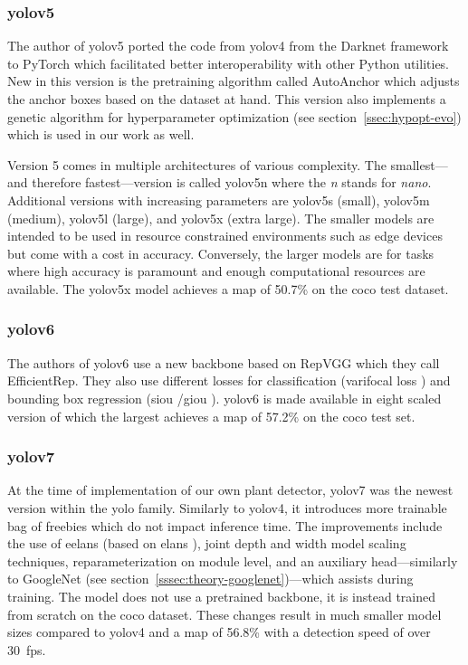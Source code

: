 \documentclass[final]{vutinfth} %
\begin{document}
\subsubsection{\gls{yolo}v5}
\label{sssec:yolov5}

The author of \gls{yolo}v5 \cite{jocher2020} ported the code from
\gls{yolo}v4 from the Darknet framework to PyTorch which facilitated
better interoperability with other Python utilities. New in this
version is the pretraining algorithm called AutoAnchor which adjusts
the anchor boxes based on the dataset at hand. This version also
implements a genetic algorithm for hyperparameter optimization (see
section~\ref{ssec:hypopt-evo}) which is used in our work as well.

Version 5 comes in multiple architectures of various complexity. The
smallest---and therefore fastest---version is called \gls{yolo}v5n where
the \emph{n} stands for \emph{nano}. Additional versions with
increasing parameters are \gls{yolo}v5s (small), \gls{yolo}v5m
(medium), \gls{yolo}v5l (large), and \gls{yolo}v5x (extra large). The
smaller models are intended to be used in resource constrained
environments such as edge devices but come with a cost in
accuracy. Conversely, the larger models are for tasks where high
accuracy is paramount and enough computational resources are
available. The \gls{yolo}v5x model achieves a \gls{map} of 50.7\% on
the \gls{coco} test dataset.

\subsubsection{\gls{yolo}v6}
\label{sssec:yolov6}

The authors of \gls{yolo}v6 \cite{li2022a} use a new backbone based on
RepVGG \cite{ding2021} which they call EfficientRep. They also use
different losses for classification (varifocal loss \cite{zhang2021})
and bounding box regression (\gls{siou}
\cite{gevorgyan2022}/\gls{giou} \cite{rezatofighi2019}). \gls{yolo}v6
is made available in eight scaled version of which the largest
achieves a \gls{map} of 57.2\% on the \gls{coco} test set.

\subsubsection{\gls{yolo}v7}
\label{sssec:yolov7}

At the time of implementation of our own plant detector, \gls{yolo}v7
\cite{wang2022} was the newest version within the \gls{yolo}
family. Similarly to \gls{yolo}v4, it introduces more trainable bag of
freebies which do not impact inference time. The improvements include
the use of \glspl{eelan} (based on \glspl{elan} \cite{wang2022a}),
joint depth and width model scaling techniques, reparameterization on
module level, and an auxiliary head---similarly to GoogleNet (see
section~\ref{sssec:theory-googlenet})---which assists during
training. The model does not use a pretrained backbone, it is instead
trained from scratch on the \gls{coco} dataset. These changes result
in much smaller model sizes compared to \gls{yolo}v4 and a \gls{map}
of 56.8\% with a detection speed of over \qty{30}{fps}.
\end{document}
